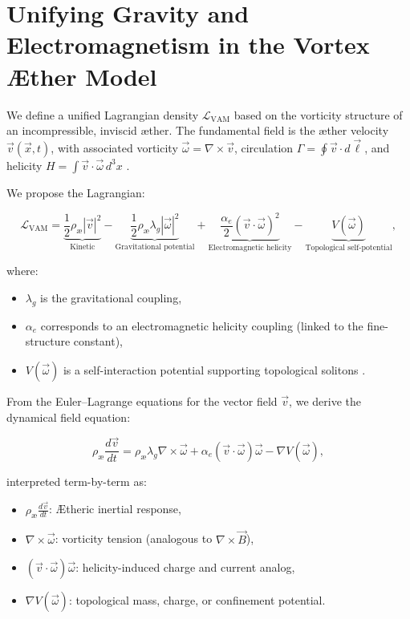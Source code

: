\section{Unifying Gravity and Electromagnetism in the Vortex Æther Model}

We define a unified Lagrangian density $\mathcal{L}_\text{VAM}$ based on the vorticity structure of an incompressible, inviscid æther. The fundamental field is the æther velocity $\vec{v}(\vec{x}, t)$, with associated vorticity $\vec{\omega} = \nabla \times \vec{v}$, circulation $\Gamma = \oint \vec{v} \cdot d\vec{\ell}$, and helicity $H = \int \vec{v} \cdot \vec{\omega} \, d^3x$ \cite{moffatt1969degree, arnold1998topological}.

We propose the Lagrangian:

\begin{equation}
\label{eq:L_VAM}
\mathcal{L}_\text{VAM} =
\underbrace{\frac{1}{2} \rho_\text{\ae} |\vec{v}|^2}_{\text{Kinetic}} -
\underbrace{\frac{1}{2} \rho_\text{\ae} \lambda_g |\vec{\omega}|^2}_{\text{Gravitational potential}} +
\underbrace{\frac{\alpha_e}{2} (\vec{v} \cdot \vec{\omega})^2}_{\text{Electromagnetic helicity}} -
\underbrace{V(\vec{\omega})}_{\text{Topological self-potential}},
\end{equation}

where:
\begin{itemize}
    \item $\lambda_g$ is the gravitational coupling,
    \item $\alpha_e$ corresponds to an electromagnetic helicity coupling (linked to the fine-structure constant),
    \item $V(\vec{\omega})$ is a self-interaction potential supporting topological solitons \cite{faddeev1997stable, babaev2002knotted}.
\end{itemize}

From the Euler--Lagrange equations for the vector field $\vec{v}$, we derive the dynamical field equation:

\begin{equation}
\label{eq:VAM_dynamics}
\rho_\text{\ae} \frac{d \vec{v}}{dt} =
\rho_\text{\ae} \lambda_g \nabla \times \vec{\omega}
+ \alpha_e (\vec{v} \cdot \vec{\omega}) \vec{\omega}
- \nabla V(\vec{\omega}),
\end{equation}

interpreted term-by-term as:
\begin{itemize}
    \item $\rho_\text{\ae} \frac{d \vec{v}}{dt}$: Ætheric inertial response,
    \item $\nabla \times \vec{\omega}$: vorticity tension (analogous to $\nabla \times \vec{B}$),
    \item $(\vec{v} \cdot \vec{\omega}) \vec{\omega}$: helicity-induced charge and current analog,
    \item $\nabla V(\vec{\omega})$: topological mass, charge, or confinement potential.
\end{itemize}

